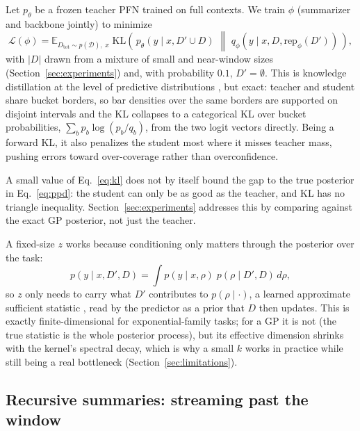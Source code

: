 \documentclass[11pt]{article}
\newcommand{\Dtot}{D_{\mathrm{tot}}}
\newcommand{\Dfar}{D'}
\newcommand{\Dloc}{D}
\newcommand{\KL}[2]{\mathrm{KL}\!\left(#1 \,\middle\|\, #2\right)}
\newcommand{\rep}{\mathrm{rep}}
\begin{document}
Let $p_\theta$ be a frozen teacher PFN trained on full contexts. We train
$\phi$ (summarizer and backbone jointly) to minimize
\begin{equation}
\label{eq:kl}
  \mathcal{L}(\phi)
  = \mathbb{E}_{\Dtot \sim p(\mathcal{D}),\; x}\;
    \KL{\,p_\theta(y \mid x, \Dfar \cup \Dloc)\,}{\,q_\phi(y \mid x, \Dloc, \rep_\phi(\Dfar))\,},
\end{equation}
with $|\Dloc|$ drawn from a mixture of small and near-window sizes
(Section~\ref{sec:experiments}) and, with probability $0.1$, $\Dfar =
\emptyset$. This is knowledge distillation \citep{hinton2015distillation}
at the level of predictive distributions
\citep{korattikara2015darkknowledge, malinin2020edd}, but exact: teacher
and student share bucket borders, so bar densities over the same borders
are supported on disjoint intervals and the KL collapses to a categorical
KL over bucket probabilities, $\sum_b p_b \log(p_b/q_b)$, from the two
logit vectors directly. Being a forward KL, it also penalizes the student
most where it misses teacher mass, pushing errors toward over-coverage
rather than overconfidence.

A small value of Eq.~\eqref{eq:kl} does not by itself bound the gap to the
true posterior in Eq.~\eqref{eq:ppd}: the student can only be as good as
the teacher, and KL has no triangle inequality. Section~\ref{sec:experiments}
addresses this by comparing against the exact GP posterior, not just the
teacher.

A fixed-size $z$ works because conditioning only matters through the
posterior over the task:
\begin{equation}
  p(y \mid x, \Dfar, \Dloc)
  = \int p(y \mid x, \rho)\; p(\rho \mid \Dfar, \Dloc)\, d\rho ,
\end{equation}
so $z$ only needs to carry what $\Dfar$ contributes to $p(\rho \mid \cdot)$,
a learned approximate sufficient statistic \citep{chen2021nass}, read
by the predictor as a prior that $\Dloc$ then updates. This is exactly
finite-dimensional for exponential-family tasks; for a GP it is not (the
true statistic is the whole posterior process), but its effective dimension
shrinks with the kernel's spectral decay, which is why a small $k$ works in
practice while still being a real bottleneck (Section~\ref{sec:limitations}).

\subsection{Recursive summaries: streaming past the window}
\label{sec:recursive}
\end{document}
